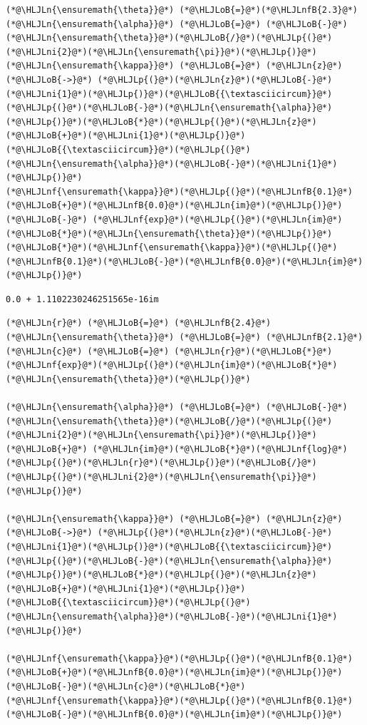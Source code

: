 \documentclass[12pt,a4paper]{article}
\newcommand{\HLJLn}[1]{#1}
\newcommand{\HLJLnf}[1]{\textcolor[RGB]{66,102,213}{#1}}
\newcommand{\HLJLnfB}[1]{\textcolor[RGB]{59,151,46}{#1}}
\newcommand{\HLJLni}[1]{\textcolor[RGB]{59,151,46}{#1}}
\newcommand{\HLJLoB}[1]{\textcolor[RGB]{102,102,102}{\textbf{#1}}}
\newcommand{\HLJLp}[1]{#1}
\begin{document}
\begin{lstlisting}
(*@\HLJLn{\ensuremath{\theta}}@*) (*@\HLJLoB{=}@*)(*@\HLJLnfB{2.3}@*)
(*@\HLJLn{\ensuremath{\alpha}}@*) (*@\HLJLoB{=}@*) (*@\HLJLoB{-}@*)(*@\HLJLn{\ensuremath{\theta}}@*)(*@\HLJLoB{/}@*)(*@\HLJLp{(}@*)(*@\HLJLni{2}@*)(*@\HLJLn{\ensuremath{\pi}}@*)(*@\HLJLp{)}@*)
(*@\HLJLn{\ensuremath{\kappa}}@*) (*@\HLJLoB{=}@*) (*@\HLJLn{z}@*) (*@\HLJLoB{->}@*) (*@\HLJLp{(}@*)(*@\HLJLn{z}@*)(*@\HLJLoB{-}@*)(*@\HLJLni{1}@*)(*@\HLJLp{)}@*)(*@\HLJLoB{{\textasciicircum}}@*)(*@\HLJLp{(}@*)(*@\HLJLoB{-}@*)(*@\HLJLn{\ensuremath{\alpha}}@*)(*@\HLJLp{)}@*)(*@\HLJLoB{*}@*)(*@\HLJLp{(}@*)(*@\HLJLn{z}@*)(*@\HLJLoB{+}@*)(*@\HLJLni{1}@*)(*@\HLJLp{)}@*)(*@\HLJLoB{{\textasciicircum}}@*)(*@\HLJLp{(}@*)(*@\HLJLn{\ensuremath{\alpha}}@*)(*@\HLJLoB{-}@*)(*@\HLJLni{1}@*)(*@\HLJLp{)}@*)
(*@\HLJLnf{\ensuremath{\kappa}}@*)(*@\HLJLp{(}@*)(*@\HLJLnfB{0.1}@*)(*@\HLJLoB{+}@*)(*@\HLJLnfB{0.0}@*)(*@\HLJLn{im}@*)(*@\HLJLp{)}@*) (*@\HLJLoB{-}@*) (*@\HLJLnf{exp}@*)(*@\HLJLp{(}@*)(*@\HLJLn{im}@*)(*@\HLJLoB{*}@*)(*@\HLJLn{\ensuremath{\theta}}@*)(*@\HLJLp{)}@*)(*@\HLJLoB{*}@*)(*@\HLJLnf{\ensuremath{\kappa}}@*)(*@\HLJLp{(}@*)(*@\HLJLnfB{0.1}@*)(*@\HLJLoB{-}@*)(*@\HLJLnfB{0.0}@*)(*@\HLJLn{im}@*)(*@\HLJLp{)}@*)
\end{lstlisting}

\begin{lstlisting}
0.0 + 1.1102230246251565e-16im
\end{lstlisting}


\begin{lstlisting}
(*@\HLJLn{r}@*) (*@\HLJLoB{=}@*) (*@\HLJLnfB{2.4}@*)
(*@\HLJLn{\ensuremath{\theta}}@*) (*@\HLJLoB{=}@*) (*@\HLJLnfB{2.1}@*)
(*@\HLJLn{c}@*) (*@\HLJLoB{=}@*) (*@\HLJLn{r}@*)(*@\HLJLoB{*}@*)(*@\HLJLnf{exp}@*)(*@\HLJLp{(}@*)(*@\HLJLn{im}@*)(*@\HLJLoB{*}@*)(*@\HLJLn{\ensuremath{\theta}}@*)(*@\HLJLp{)}@*)

(*@\HLJLn{\ensuremath{\alpha}}@*) (*@\HLJLoB{=}@*) (*@\HLJLoB{-}@*)(*@\HLJLn{\ensuremath{\theta}}@*)(*@\HLJLoB{/}@*)(*@\HLJLp{(}@*)(*@\HLJLni{2}@*)(*@\HLJLn{\ensuremath{\pi}}@*)(*@\HLJLp{)}@*) (*@\HLJLoB{+}@*) (*@\HLJLn{im}@*)(*@\HLJLoB{*}@*)(*@\HLJLnf{log}@*)(*@\HLJLp{(}@*)(*@\HLJLn{r}@*)(*@\HLJLp{)}@*)(*@\HLJLoB{/}@*)(*@\HLJLp{(}@*)(*@\HLJLni{2}@*)(*@\HLJLn{\ensuremath{\pi}}@*)(*@\HLJLp{)}@*)

(*@\HLJLn{\ensuremath{\kappa}}@*) (*@\HLJLoB{=}@*) (*@\HLJLn{z}@*) (*@\HLJLoB{->}@*) (*@\HLJLp{(}@*)(*@\HLJLn{z}@*)(*@\HLJLoB{-}@*)(*@\HLJLni{1}@*)(*@\HLJLp{)}@*)(*@\HLJLoB{{\textasciicircum}}@*)(*@\HLJLp{(}@*)(*@\HLJLoB{-}@*)(*@\HLJLn{\ensuremath{\alpha}}@*)(*@\HLJLp{)}@*)(*@\HLJLoB{*}@*)(*@\HLJLp{(}@*)(*@\HLJLn{z}@*)(*@\HLJLoB{+}@*)(*@\HLJLni{1}@*)(*@\HLJLp{)}@*)(*@\HLJLoB{{\textasciicircum}}@*)(*@\HLJLp{(}@*)(*@\HLJLn{\ensuremath{\alpha}}@*)(*@\HLJLoB{-}@*)(*@\HLJLni{1}@*)(*@\HLJLp{)}@*)

(*@\HLJLnf{\ensuremath{\kappa}}@*)(*@\HLJLp{(}@*)(*@\HLJLnfB{0.1}@*)(*@\HLJLoB{+}@*)(*@\HLJLnfB{0.0}@*)(*@\HLJLn{im}@*)(*@\HLJLp{)}@*)(*@\HLJLoB{-}@*)(*@\HLJLn{c}@*)(*@\HLJLoB{*}@*)(*@\HLJLnf{\ensuremath{\kappa}}@*)(*@\HLJLp{(}@*)(*@\HLJLnfB{0.1}@*)(*@\HLJLoB{-}@*)(*@\HLJLnfB{0.0}@*)(*@\HLJLn{im}@*)(*@\HLJLp{)}@*)
\end{lstlisting}
\end{document}
